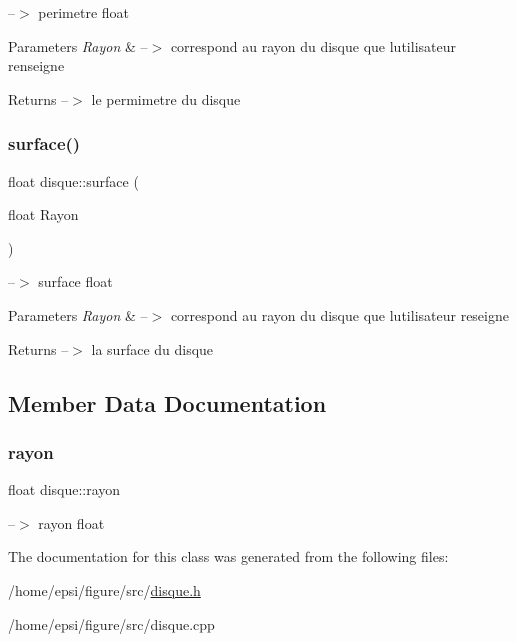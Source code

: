 --$>$ perimetre  float 
\begin{DoxyParams}{Parameters}
{\em Rayon} & --$>$ correspond au rayon du disque que l\textquotesingle{}utilisateur renseigne \\
\hline
\end{DoxyParams}
\begin{DoxyReturn}{Returns}
--$>$ le permimetre du disque 
\end{DoxyReturn}
\mbox{\label{classdisque_ab1db5f6b62c0c1d03569f0c8bf08eaa6}} 
\subsubsection{\texorpdfstring{surface()}{surface()}}
{\footnotesize\ttfamily float disque\+::surface (\begin{DoxyParamCaption}\item[{float}]{Rayon }\end{DoxyParamCaption})}

--$>$ surface  float 
\begin{DoxyParams}{Parameters}
{\em Rayon} & --$>$ correspond au rayon du disque que l\textquotesingle{}utilisateur reseigne \\
\hline
\end{DoxyParams}
\begin{DoxyReturn}{Returns}
--$>$ la surface du disque 
\end{DoxyReturn}


\subsection{Member Data Documentation}
\mbox{\label{classdisque_ac9ae86ee1309e5fec237632aeb70c0af}} 
\subsubsection{\texorpdfstring{rayon}{rayon}}
{\footnotesize\ttfamily float disque\+::rayon}

--$>$ rayon  float 

The documentation for this class was generated from the following files\+:\begin{DoxyCompactItemize}
\item 
/home/epsi/figure/src/\hyperlink{disque_8h}{disque.\+h}\item 
/home/epsi/figure/src/disque.\+cpp\end{DoxyCompactItemize}
